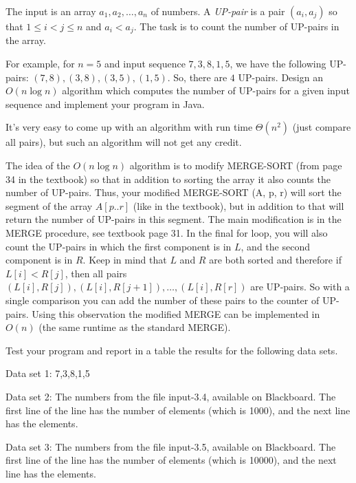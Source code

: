 \documentclass[11pt]{article}
\begin{document}
\begin{enumerate}
The input is an array $a_1, a_2, \ldots, a_n$ of numbers.  A  \emph{UP-pair} is a pair $(a_i, a_j)$  so that $1 \le i < j \le n$ and $a_i < a_j$. The task is to count the number of UP-pairs
in the array.

For example, for $n = 5$ and input sequence $7, 3, 8, 1, 5$, we have the following UP-pairs: $(7,8),  (3, 8),  (3, 5),  (1,5)$.  So, there are $4$ UP-pairs. 
Design an $O(n \log n)$ algorithm which computes the number of UP-pairs for a
given input sequence and implement your program in Java.

It's very easy to come up with an algorithm with run time  $\Theta(n^2)$ (just compare all pairs), but such an algorithm will not get any credit.

The idea of the $O(n \log n)$  algorithm is to modify MERGE-SORT (from page 34 in the textbook)  so that in addition to sorting the array it also counts the number of UP-pairs. Thus, your modified MERGE-SORT (A, p, r) will sort the segment of the array $A[p..r]$  (like in the textbook), but in addition to that will return the number of UP-pairs in this segment.  The main modification is in the MERGE  procedure, see textbook page 31. In the final for loop, you will also count the UP-pairs in which the first component is in $L$, and the second component is in $R$. Keep in mind that $L$ and $R$ are both sorted and therefore if $L[i] < R[j]$, then all pairs $(L[i], R[j]),  (L[i], R[j+1]), \ldots, (L[i], R[r])$ are UP-pairs. So with a single comparison you can add the number of these pairs to the counter of UP-pairs. Using this observation the modified MERGE can be implemented in $O(n)$ (the same runtime as the standard MERGE).
\medskip




Test your program and report in a table the results for the following data sets.

Data set 1:  7,3,8,1,5

Data set 2:  The  numbers from the file input-3.4, available on Blackboard. The first line of the line has the number of elements (which is 1000), and the next line has the elements.

Data set 3:  The  numbers from the file input-3.5, available on Blackboard. The first line of the line has the number of elements (which is 10000), and the next line has the elements.

 

 




















\end{enumerate}
\end{document}
